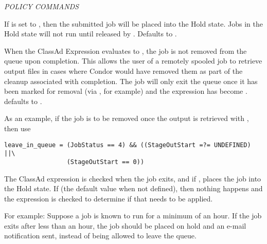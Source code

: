 \emph{POLICY COMMANDS}
\begin{description} 


\item[hold = $<$True \Bar\ False$>$] If  is set to
, then the submitted job will be placed into the Hold state.
Jobs in the Hold state will not run until released by .
Defaults to .


\item[leave\_in\_queue = $<$ClassAd Boolean Expression$>$]
When the ClassAd Expression evaluates to , the job is
not removed from the queue upon completion.
This allows the user of a remotely spooled job to retrieve output
files in cases where Condor would have removed them as part of
the cleanup associated with completion. The job will only exit
the queue once it has been marked for removal (via ,
for example) and the  expression has
become .
 defaults to .

As an example, if the job is to be removed once the output is retrieved
with , then use 
\footnotesize
\begin{verbatim}
leave_in_queue = (JobStatus == 4) && ((StageOutStart =?= UNDEFINED) ||\
                 (StageOutStart == 0))
\end{verbatim}
\normalsize


\item[on\_exit\_hold = $<$ClassAd Boolean Expression$>$] 
The ClassAd expression is checked when the job exits, and if ,
places the job into the Hold state.
If  (the default value when not defined),
then nothing happens and the  expression is
checked to determine if that needs to be applied.

For example:
Suppose a job is known to run for a minimum of an hour.
If the job exits after less than an hour, the job should be placed on
hold and an e-mail notification sent,
instead of being allowed to leave the queue.


\end{description}
